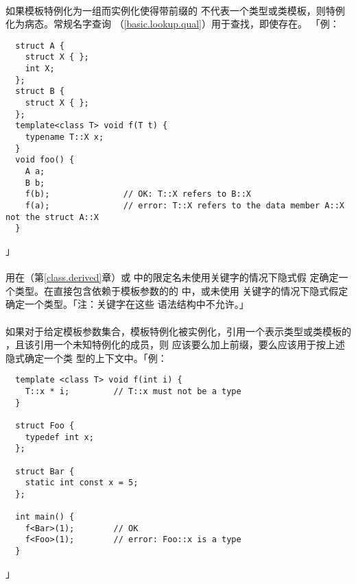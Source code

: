 
\paragraph{}
如果模板特例化为一组而实例化使得带前缀的
不代表一个类型或类模板，则特例化为病态。常规名字查询
（\ref{basic.lookup.qual}）用于查找，即使存在。
「例：
\begin{lstlisting}
  struct A {
    struct X { };
    int X;
  };
  struct B {
    struct X { };
  };
  template<class T> void f(T t) {
    typename T::X x;
  }
  void foo() {
    A a;
    B b;
    f(b);               // OK: T::X refers to B::X
    f(a);               // error: T::X refers to the data member A::X not the struct A::X
  }
\end{lstlisting}」

\paragraph{}
用在（第\ref{class.derived}章）或
中的限定名未使用关键字的情况下隐式假
定确定一个类型。在直接包含依赖于模板参数的的
中，或未使用
关键字的情况下隐式假定确定一个类型。「注：关键字在这些
语法结构中不允许。」

\paragraph{}
如果对于给定模板参数集合，模板特例化被实例化，引用一个表示类型或类模板的
，且该引用一个未知特例化的成员，则
应该要么加上前缀，要么应该用于按上述隐式确定一个类
型的上下文中。「例：
\begin{lstlisting}
  template <class T> void f(int i) {
    T::x * i;         // T::x must not be a type
  }

  struct Foo {
    typedef int x;
  };

  struct Bar {
    static int const x = 5;
  };

  int main() {
    f<Bar>(1);        // OK
    f<Foo>(1);        // error: Foo::x is a type
  }
\end{lstlisting}」

